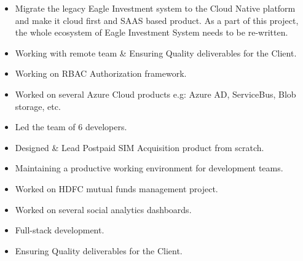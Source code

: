 \documentclass[10pt,a4paper,ragged2e]{colorcv}
\begin{document}

    \begin{fullwidth}
        \makecvheader
    \end{fullwidth}



    \begin{itemize}
        \item Migrate the legacy Eagle Investment system to the Cloud Native platform and make it cloud first and SAAS based product. As a part of this project, the whole ecosystem of Eagle Investment System needs to be re-written.
        \item Working with remote team \& Ensuring Quality deliverables for the Client.
        \item Working on RBAC Authorization framework.
        \item Worked on several Azure Cloud products e.g: Azure AD, ServiceBus, Blob storage, etc.
    \end{itemize}

    \divider

    \begin{itemize}
        \item Led the team of 6 developers.
        \item Designed \& Lead Postpaid SIM Acquisition product from scratch.
        \item Maintaining a productive working environment for development teams.
    \end{itemize}

    \divider

    \begin{itemize}
        \item Worked on HDFC mutual funds management project.
        \item Worked on several social analytics dashboards.
        \item Full-stack development.
        \item Ensuring Quality deliverables for the Client.
    \end{itemize}
\end{document}
